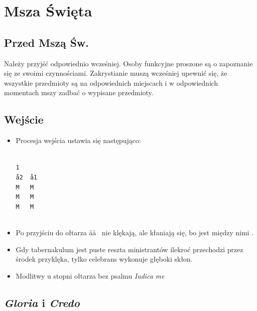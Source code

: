 \section{Msza Święta}

\subsection{Przed Mszą Św.}

Należy przyjść odpowiednio wcześniej. Osoby funkcyjne proszone są o zapoznanie
się ze swoimi czynnościami. Zakrystianie muszą wcześniej upewnić się, że
wszystkie przedmioty są na odpowiednich miejscach i w odpowiednich momentach
mszy zadbać o wypisane przedmioty.

\subsection{Wejście}

\begin{itemize}
      \item Procesja wejścia ustawia się następująco:
            \begin{center}
                  \uparrow \smallskip\\
                  \tt1~~~ \smallskip\\
                  \aa2~~\aa1 \smallskip\\
                  M~~~M \smallskip\\
                  M~~~M \smallskip\\
                  M~~~M \smallskip\\
                   \smallskip\\
                  \ii
            \end{center}
      \item Po przyjściu do ołtarza \aa\aa~ nie klękają, ale kłaniają się, bo jest
            między nimi .
      \item Gdy tabernakulum jest puste reszta ministrantów ilekroć przechodzi
            przez środek przyklęka, tylko celebrans wykonuje głęboki skłon.
      \item Modlitwy u stopni ołtarza bez psalmu \textit{Iudica me}
\end{itemize}

\subsection{\textit{Gloria} i \textit{Credo}}

